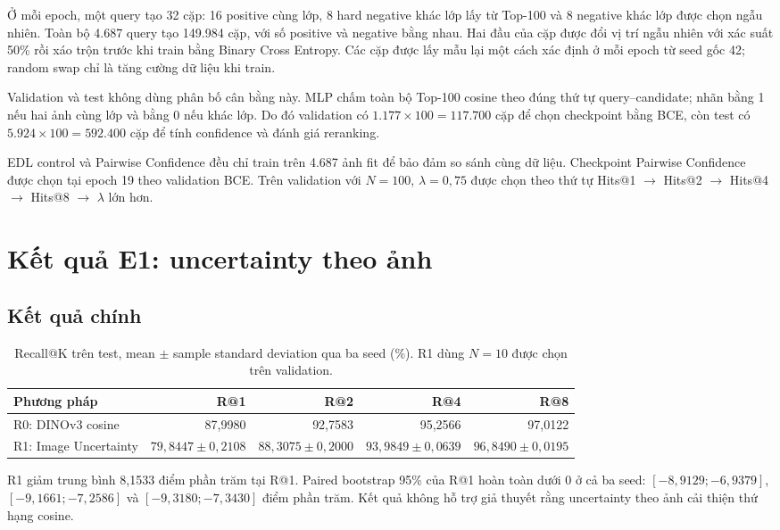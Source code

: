 \documentclass[11pt,a4paper]{article}
\begin{document}
Ở mỗi epoch, một query tạo 32 cặp: 16 positive cùng lớp, 8 hard negative khác
lớp lấy từ Top-100 và 8 negative khác lớp được chọn ngẫu nhiên. Toàn bộ 4.687
query tạo 149.984 cặp, với số positive và negative bằng nhau. Hai đầu của cặp
được đổi vị trí ngẫu nhiên với xác suất 50\% rồi xáo trộn trước khi train bằng
Binary Cross Entropy. Các cặp được lấy mẫu lại một cách xác định ở mỗi epoch
từ seed gốc 42; random swap chỉ là tăng cường dữ liệu khi train.

Validation và test không dùng phân bố cân bằng này. MLP chấm toàn bộ Top-100
cosine theo đúng thứ tự query--candidate; nhãn bằng 1 nếu hai ảnh cùng lớp và
bằng 0 nếu khác lớp. Do đó validation có
$1.177\times100=117.700$ cặp để chọn checkpoint bằng BCE, còn test có
$5.924\times100=592.400$ cặp để tính confidence và đánh giá reranking.

EDL control và Pairwise Confidence đều chỉ train trên 4.687 ảnh fit để bảo
đảm so sánh cùng dữ liệu. Checkpoint Pairwise Confidence được chọn tại epoch
19 theo validation BCE. Trên validation với $N=100$, $\lambda=0{,}75$ được
chọn theo thứ tự Hits@1 $\rightarrow$ Hits@2 $\rightarrow$ Hits@4
$\rightarrow$ Hits@8 $\rightarrow$ $\lambda$ lớn hơn.

\section{Kết quả E1: uncertainty theo ảnh}
\subsection{Kết quả chính}
\begin{table}[H]
\centering
\caption{Recall@K trên test, mean $\pm$ sample standard deviation qua ba seed
(\%). R1 dùng $N=10$ được chọn trên validation.}
\begin{tabular}{@{}lrrrr@{}}
\toprule
Phương pháp & R@1 & R@2 & R@4 & R@8\\ \midrule
R0: DINOv3 cosine & 87,9980 & 92,7583 & 95,2566 & 97,0122\\
R1: Image Uncertainty
& $79,8447\pm0,2108$ & $88,3075\pm0,2000$
& $93,9849\pm0,0639$ & $96,8490\pm0,0195$\\
\bottomrule
\end{tabular}
\end{table}

R1 giảm trung bình 8,1533 điểm phần trăm tại R@1. Paired bootstrap 95\% của
R@1 hoàn toàn dưới 0 ở cả ba seed: $[-8{,}9129;-6{,}9379]$,
$[-9{,}1661;-7{,}2586]$ và $[-9{,}3180;-7{,}3430]$ điểm phần trăm. Kết quả
không hỗ trợ giả thuyết rằng uncertainty theo ảnh cải thiện thứ hạng cosine.
\end{document}
